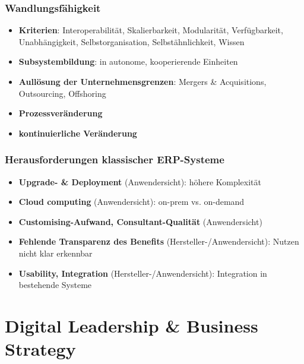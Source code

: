 \documentclass{article}
\begin{document}
\subsubsection{Wandlungsfähigkeit}
\begin{itemize}
  \item \textbf{Kriterien}: Interoperabilität, Skalierbarkeit, Modularität, Verfügbarkeit, Unabhängigkeit, Selbstorganisation, Selbstähnlichkeit, Wissen
  \item \textbf{Subsystembildung}: in autonome, kooperierende Einheiten
  \item \textbf{Aullösung der Unternehmensgrenzen}: Mergers \& Acquisitions, Outsourcing, Offshoring
  \item \textbf{Prozessveränderung}
  \item \textbf{kontinuierliche Veränderung}
\end{itemize}

\subsubsection{Herausforderungen klassischer ERP-Systeme}
\begin{itemize}
  \item \textbf{Upgrade- \& Deployment} (Anwendersicht): höhere Komplexität
  \item \textbf{Cloud computing} (Anwendersicht): on-prem vs. on-demand
  \item \textbf{Customising-Aufwand, Consultant-Qualität} (Anwendersicht)
  \item \textbf{Fehlende Transparenz des Benefits} (Hersteller-/Anwendersicht): Nutzen nicht klar erkennbar
  \item \textbf{Usability, Integration} (Hersteller-/Anwendersicht): Integration in bestehende Systeme
\end{itemize}

\section{Digital Leadership \& Business Strategy}
\end{document}
